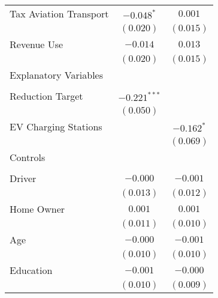 \begin{center}
\begin{tiny}
\begin{longtable}{l@{} c@{} c@{}}
\quad Tax Aviation Transport                             & $-0.048^{*}$    & $0.001$        \\
                                                         & $(0.020)$       & $(0.015)$      \\
\quad Revenue Use                                        & $-0.014$        & $0.013$        \\
                                                         & $(0.020)$       & $(0.015)$      \\
Explanatory Variables                                    &                 &                \\
                                                         &                 &                \\
\quad Reduction Target                                   & $-0.221^{***}$  &                \\
                                                         & $(0.050)$       &                \\
\quad EV Charging Stations                               &                 & $-0.162^{*}$   \\
                                                         &                 & $(0.069)$      \\
Controls                                                 &                 &                \\
                                                         &                 &                \\
\quad Driver                                             & $-0.000$        & $-0.001$       \\
                                                         & $(0.013)$       & $(0.012)$      \\
\quad Home Owner                                         & $0.001$         & $0.001$        \\
                                                         & $(0.011)$       & $(0.010)$      \\
\quad Age                                                & $-0.000$        & $-0.001$       \\
                                                         & $(0.010)$       & $(0.010)$      \\
\quad Education                                          & $-0.001$        & $-0.000$       \\
                                                         & $(0.010)$       & $(0.009)$      \\

\end{longtable}
\end{tiny}
\end{center}
